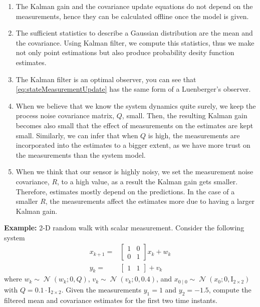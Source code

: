 \documentclass[twoside]{article}
\newcommand{\N}{\operatorname{\mathcal{N}}}
\renewcommand{\k}{_k{}}
\newcommand{\kp}{_{k+1}{}}
\begin{document}
\begin{enumerate}
	\item The Kalman gain and the covariance update equations do not depend on the measurements, hence they can be calculated offline once the model is given.
	\item The sufficient statistics to describe a Gaussian distribution are the mean and the covariance. Using Kalman filter, we compute this statistics, thus we make not only point estimations but also produce probability desity function estimates.
	\item The Kalman filter is an optimal observer, you can see that \eqref{eq:stateMeasurementUpdate} has the same form of a Luenberger's observer. 
	\item When we believe that we know the system dynamics quite surely, we keep the process noise covariance matrix, $Q$, small. Then, the resulting Kalman gain becomes also small that the effect of measurements on the estimates are kept small. Similarly, we can infer that when $Q$ is high, the measurements are incorporated into the estimates to a bigger extent, as we have more trust on the measurements than the system model.
	\item When we think that our sensor is highly noisy, we set the measurement noise covariance, $R$, to a high value, as a result the Kalman gain gets smaller. Therefore, estimates mostly depend on the predictions. In the case of a smaller $R$, the measurements affect the estimates more due to having a larger Kalman gain.
\end{enumerate}

\textbf{Example:} 2-D random walk with scalar measurement.
Consider the following system
\begin{align*}
	x\kp =& \left[ \begin{array}{cc}
		1 & 0 \\ 0 & 1
	\end{array}\right] x\k + w\k\\
	y\k =& \left[\begin{array}{cc}
		1 & 1
	\end{array} \right]  + v\k
\end{align*}
where $w\k \sim \N(w\k;0,Q) $, $v\k \sim \N(v\k;0,0.4) $, and $x_{0\mid 0}\sim\N(x_0;0,\mathrm{I}_{2\times2 })$ with $Q = 0.1\cdot \mathrm{I}_{2\times2}$. Given the measurements $y_1 = 1$  and $y_2=-1.5$, compute the filtered mean and covariance estimates for the first two time instants.
\end{document}
